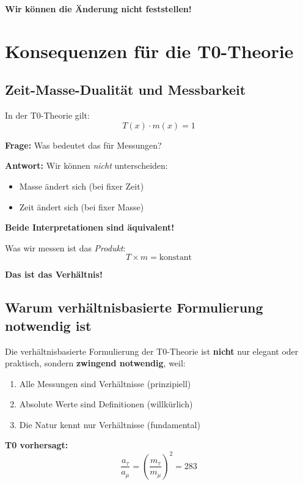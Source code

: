 \textbf{Wir können die Änderung nicht feststellen!}

\section{Konsequenzen für die T0-Theorie}

\subsection{Zeit-Masse-Dualität und Messbarkeit}

In der T0-Theorie gilt:
\begin{equation}
	T(x) \cdot m(x) = 1
\end{equation}

\textbf{Frage:} Was bedeutet das für Messungen?

\textbf{Antwort:} Wir können \textit{nicht} unterscheiden:
\begin{itemize}[nosep]
	\item Masse ändert sich (bei fixer Zeit)
	\item Zeit ändert sich (bei fixer Masse)
\end{itemize}

\textbf{Beide Interpretationen sind äquivalent!}

Was wir messen ist das \textit{Produkt}:
\begin{equation}
	T \times m = \text{konstant}
\end{equation}

\textbf{Das ist das Verhältnis!}

\subsection{Warum verhältnisbasierte Formulierung notwendig ist}

Die verhältnisbasierte Formulierung der T0-Theorie ist \textbf{nicht} nur elegant oder praktisch, sondern \textbf{zwingend notwendig}, weil:

\begin{enumerate}
	\item Alle Messungen sind Verhältnisse (prinzipiell)
	\item Absolute Werte sind Definitionen (willkürlich)
	\item Die Natur kennt nur Verhältnisse (fundamental)
\end{enumerate}

\textbf{T0 vorhersagt:}
\begin{equation}
	\frac{a_\tau}{a_\mu} = \left(\frac{m_\tau}{m_\mu}\right)^2 = 283
\end{equation}

